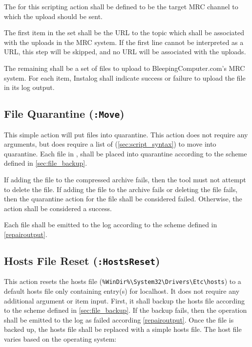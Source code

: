 The  for this scripting action shall be defined to be the target MRC
channel to which the upload should be sent.

The first item in the set  shall be the URL to the topic which shall
be associated with the uploads in the MRC system. If the first line cannot be
interpreted as a URL, this step will be skipped, and no URL will be associated
with the uploads.

The remaining  shall be a set of files to upload to
BleepingComputer.com's MRC system. For each item, Instalog shall indicate
success or failure to upload the file in its log output.

\subsection{File Quarantine (\texttt{:Move})} \label{quarantine}
This simple action will put files into quarantine.  This action does not require
any arguments, but does require a list of  (\ref{sec:script_syntax})
to move into quarantine.  Each file in , shall be placed into
quarantine according to the scheme defined in \ref{sec:file_backup}.

If adding the file to the compressed archive fails, then the tool must not
attempt to delete the file.  If adding the file to the archive fails or deleting
the file fails, then the quarantine action for the file shall be considered
failed.  Otherwise, the action shall be considered a success.  

Each file shall be emitted to the log according to the scheme defined in
\ref{repairoutput}.

\subsection{Hosts File Reset (\texttt{:HostsReset})}
This action resets the hosts file (\verb|%WinDir%\System32\Drivers\Etc\hosts|)
to a default hosts file only containing entry(s) for localhost.  It does not
require any additional argument or item input. First, it shall backup the hosts
file according to the scheme defined in \ref{sec:file_backup}.  If the backup
fails, then the operation shall be emitted to the log as failed according
\ref{repairoutput}. Once the file is backed up, the hosts file shall be replaced
with a simple hosts file.  The host file varies based on the operating system:


